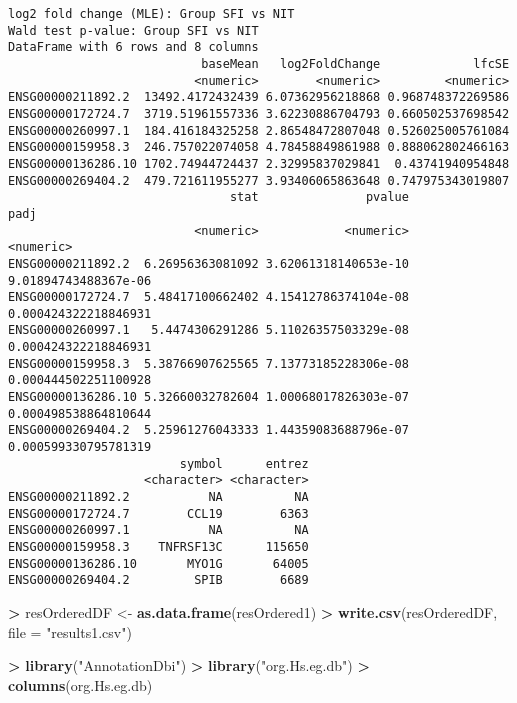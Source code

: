 \documentclass[
]{article}
\newenvironment{Shaded}{\begin{snugshade}}{\end{snugshade}}
\newcommand{\DataTypeTok}[1]{\textcolor[rgb]{0.13,0.29,0.53}{#1}}
\newcommand{\KeywordTok}[1]{\textcolor[rgb]{0.13,0.29,0.53}{\textbf{#1}}}
\newcommand{\NormalTok}[1]{#1}
\newcommand{\OperatorTok}[1]{\textcolor[rgb]{0.81,0.36,0.00}{\textbf{#1}}}
\newcommand{\StringTok}[1]{\textcolor[rgb]{0.31,0.60,0.02}{#1}}
\begin{document}
\begin{verbatim}
log2 fold change (MLE): Group SFI vs NIT 
Wald test p-value: Group SFI vs NIT 
DataFrame with 6 rows and 8 columns
                           baseMean   log2FoldChange             lfcSE
                          <numeric>        <numeric>         <numeric>
ENSG00000211892.2  13492.4172432439 6.07362956218868 0.968748372269586
ENSG00000172724.7  3719.51961557336 3.62230886704793 0.660502537698542
ENSG00000260997.1  184.416184325258 2.86548472807048 0.526025005761084
ENSG00000159958.3  246.757022074058 4.78458849861988 0.888062802466163
ENSG00000136286.10 1702.74944724437 2.32995837029841  0.43741940954848
ENSG00000269404.2  479.721611955277 3.93406065863648 0.747975343019807
                               stat               pvalue                 padj
                          <numeric>            <numeric>            <numeric>
ENSG00000211892.2  6.26956363081092 3.62061318140653e-10 9.01894743488367e-06
ENSG00000172724.7  5.48417100662402 4.15412786374104e-08 0.000424322218846931
ENSG00000260997.1   5.4474306291286 5.11026357503329e-08 0.000424322218846931
ENSG00000159958.3  5.38766907625565 7.13773185228306e-08 0.000444502251100928
ENSG00000136286.10 5.32660032782604 1.00068017826303e-07 0.000498538864810644
ENSG00000269404.2  5.25961276043333 1.44359083688796e-07 0.000599330795781319
                        symbol      entrez
                   <character> <character>
ENSG00000211892.2           NA          NA
ENSG00000172724.7        CCL19        6363
ENSG00000260997.1           NA          NA
ENSG00000159958.3    TNFRSF13C      115650
ENSG00000136286.10       MYO1G       64005
ENSG00000269404.2         SPIB        6689
\end{verbatim}

\begin{Shaded}
\begin{Highlighting}[]
\OperatorTok{>}\StringTok{ }\NormalTok{resOrderedDF <-}\StringTok{ }\KeywordTok{as.data.frame}\NormalTok{(resOrdered1)}
\OperatorTok{>}\StringTok{ }\KeywordTok{write.csv}\NormalTok{(resOrderedDF, }\DataTypeTok{file =} \StringTok{"results1.csv"}\NormalTok{)}
\end{Highlighting}
\end{Shaded}

\begin{Shaded}
\begin{Highlighting}[]
\OperatorTok{>}\StringTok{ }\KeywordTok{library}\NormalTok{(}\StringTok{"AnnotationDbi"}\NormalTok{)}
\OperatorTok{>}\StringTok{ }\KeywordTok{library}\NormalTok{(}\StringTok{"org.Hs.eg.db"}\NormalTok{)}
\OperatorTok{>}\StringTok{ }\KeywordTok{columns}\NormalTok{(org.Hs.eg.db)}
\end{Highlighting}
\end{Shaded}
\end{document}
